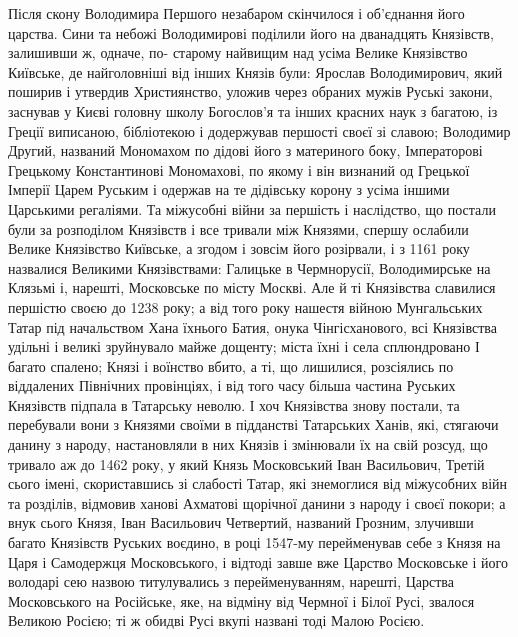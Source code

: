 Після скону Володимира Першого незабаром скінчилося і об'єднання його царства.
Сини та небожі Володимирові поділили його на дванадцять Князівств, залишивши ж,
одначе, по- старому найвищим над усіма Велике Князівство Київське, де
найголовніші від інших Князів були: Ярослав Володимирович, який поширив і
утвердив Християнство, уложив через обраних мужів Руські закони, заснував у
Києві головну школу Богослов'я та інших красних наук з багатою, із Греції
виписаною, бібліотекою і додержував першості своєї зі славою; Володимир Другий,
названий Мономахом по дідові його з материного боку, Імператорові Грецькому
Константинові Мономахові, по якому і він визнаний од Грецької Імперії Царем
Руським і одержав на те дідівську корону з усіма іншими Царськими регаліями. Та
міжусобні війни за першість і наслідство, що постали були за розподілом
Князівств і все тривали між Князями, спершу ослабили Велике Князівство
Київське, а згодом і зовсім його розірвали, і з 1161 року назвалися Великими
Князівствами: Галицьке в Чермнорусії, Володимирське на Клязьмі і, нарешті,
Московське по місту Москві. Але й ті Князівства славилися першістю своєю до
1238 року; а від того року нашестя війною Мунгальських Татар під начальством
Хана їхнього Батия, онука Чінгісханового, всі Князівства удільні і великі
зруйнувало майже дощенту; міста їхні і села сплюндровано І багато спалено;
Князі і воїнство вбито, а ті, що лишилися, розсіялись по віддалених Північних
провінціях, і від того часу більша частина Руських Князівств підпала в
Татарську неволю. І хоч Князівства знову постали, та перебували вони з Князями
своїми в підданстві Татарських Ханів, які, стягаючи данину з народу,
настановляли в них Князів і змінювали їх на свій розсуд, що тривало аж до 1462
року, у який Князь Московський Іван Васильович, Третій сього імені,
скориставшись зі слабості Татар, які знемоглися від міжусобних війн та
розділів, відмовив ханові Ахматові щорічної данини з народу і своєї покори; а
внук сього Князя, Іван Васильович Четвертий, названий Грозним, злучивши багато
Князівств Руських воєдино, в році 1547-му перейменував себе з Князя на Царя і
Самодержця Московського, і відтоді завше вже Царство Московське і його володарі
сею назвою титулувались з перейменуванням, нарешті, Царства Московського на
Російське, яке, на відміну від Чермної і Білої Русі, звалося Великою Росією; ті
ж обидві Русі вкупі названі тоді Малою Росією.

